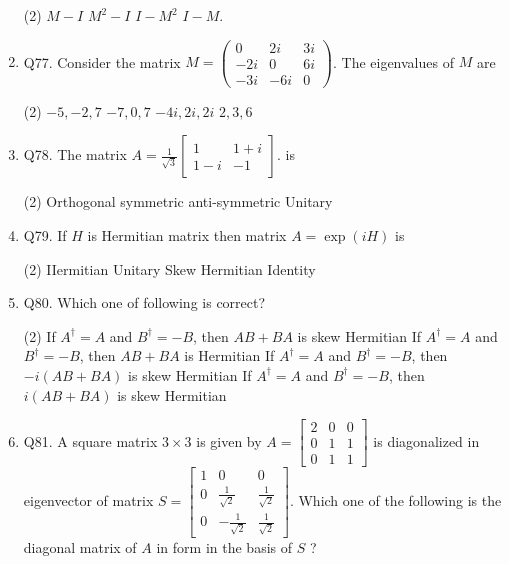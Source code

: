 \begin{enumerate}
  \begin{tasks}(2)
    	\task[\textbf{a.}]$M-I$
    	\task[\textbf{b.}]$M^{2}-I$
    	\task[\textbf{c.}]$I-M^{2}$
    	\task[\textbf{d.}] $I-M$. 
    \end{tasks}
\item Q77. Consider the matrix $M=\left(\begin{array}{ccc}0 & 2 i & 3 i \\ -2 i & 0 & 6 i \\ -3 i & -6 i & 0\end{array}\right)$. The eigenvalues of $M$ are
 \begin{tasks}(2)
	\task[\textbf{a.}]$-5,-2,7$
	\task[\textbf{b.}]$-7,0,7$
	\task[\textbf{c.}]$-4 i, 2 i, 2 i$
	\task[\textbf{d.}] $2,3,6$ 
\end{tasks}       
 \item Q78. The matrix $A=\frac{1}{\sqrt{3}}\left[\begin{array}{cc}1 & 1+i \\ 1-i & -1\end{array}\right]$.
 is
  \begin{tasks}(2)
 	\task[\textbf{a.}]Orthogonal
 	\task[\textbf{b.}]symmetric
 	\task[\textbf{c.}] anti-symmetric
 	\task[\textbf{d.}]  Unitary    
 \end{tasks}    
\item Q79. If $H$ is Hermitian matrix then matrix $A=\exp (i H)$ is
  \begin{tasks}(2)
 	\task[\textbf{a.}] IIermitian
 	\task[\textbf{b.}] Unitary
 	\task[\textbf{c.}] Skew Hermitian
 	\task[\textbf{d.}] Identity     
 \end{tasks}    
\item Q80. Which one of following is correct?
      \begin{tasks}(2)
     	\task[\textbf{a.}] If $A^{\dagger}=A$ and $B^{\dagger}=-B$, then $A B+B A$ is skew Hermitian
     	\task[\textbf{b.}]If $A^{\dagger}=A$ and $B^{\dagger}=-B$, then $A B+B A$ is Hermitian
     	\task[\textbf{c.}] If $A^{\dagger}=A$ and $B^{\dagger}=-B$, then $-i(A B+B A)$ is skew Hermitian
     	\task[\textbf{d.}]  If $A^{\dagger}=A$ and $B^{\dagger}=-B$, then $i(A B+B A)$ is skew Hermitian
     \end{tasks}
\item Q81. A square matrix $3 \times 3$ is given by $A=\left[\begin{array}{ccc}2 & 0 & 0 \\ 0 & 1 & 1 \\ 0 & 1 & 1\end{array}\right]$ is diagonalized in eigenvector of matrix $S=\left[\begin{array}{ccc}1 & 0 & 0 \\ 0 & \frac{1}{\sqrt{2}} & \frac{1}{\sqrt{2}} \\ 0 & -\frac{1}{\sqrt{2}} & \frac{1}{\sqrt{2}}\end{array}\right]$. Which one of the following is the diagonal matrix of $A$ in form in the basis of $S$ ?

\end{enumerate}
